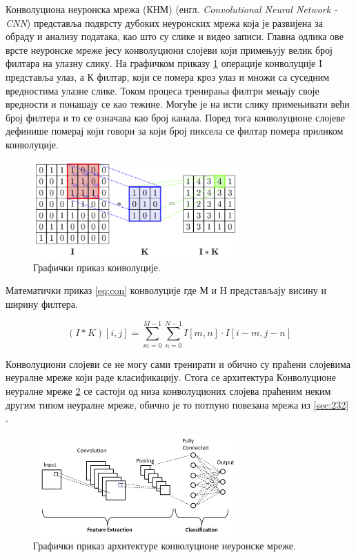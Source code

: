 \documentclass[a4paper, 12pt, master, utf8]{etf}
\begin{document}
Конволуциона неуронска мрежа (КНМ) (енгл. \textit{Convolutional Neural Network - CNN}) представља подврсту дубоких неуронских мрежа 
која је развијена за обраду и анализу података, као што су слике и видео записи. Главна одлика ове врсте неуронске мреже јесу конволуциони слојеви који примењују велик број 
филтара на улазну слику. На графичком приказу \ref{fig:convolution} операције конволуције I представља улаз, а К филтар, који се помера кроз улаз и множи са суседним вредностима улазне слике. Током процеса тренирања 
филтри мењају своје вредности и понашају се као тежине. Могуће је на исти слику примењивати већи број филтера и то се означава као број канала. Поред тога конволуционе слојеве дефинише померај који говори за који број пиксела се филтар помера приликом конволуције.

\begin{figure}[h]
    \centering
    \includegraphics[width=0.7\textwidth]{images/convolution.png}
    \caption{Графички приказ конволуције. \cite{s_mohamed_detection_2017}}
    \label{fig:convolution}
\end{figure}

Математички приказ \ref{eq:con} конволуције где М и Н представљају висину и ширину филтера.

\begin{equation}
    (I * K)[i, j] = \sum_{m=0}^{M-1} \sum_{n=0}^{N-1} I[m, n] \cdot I[i-m, j-n]
    \label{eq:con}
\end{equation}

Конволуциони слојеви се не могу сами тренирати и обично су праћени слојевима неуралне мреже који раде класификацију.
Стога се архитектура Конволуционе неуралне мреже \ref{fig:cnn} се састоји од низа конволуционих слојева праћеним неким другим типом неуралне мреже, обично је то потпуно повезана мрежа из \ref{sec:232} .

\begin{figure}[h]
    \centering
    \includegraphics[width=0.7\textwidth]{images/cnn.png}
    \caption{Графички приказ архитектуре конволуционе неуронске мреже. \cite{s_mohamed_detection_2017}}
    \label{fig:cnn}
\end{figure}
\end{document}
